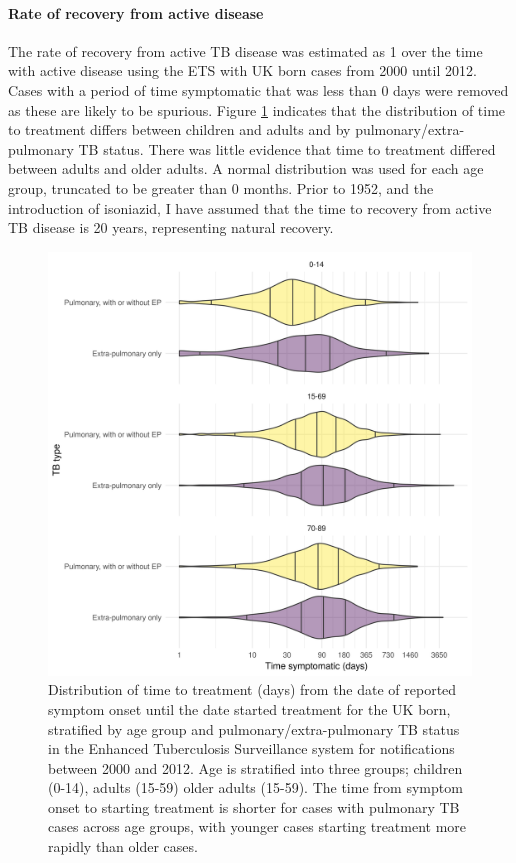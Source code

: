 \documentclass[11pt,twoside]{bristolthesis}
\begin{document}
  \hypertarget{rate-of-recovery-from-active-disease}{%
  \paragraph{Rate of recovery from active disease}\label{rate-of-recovery-from-active-disease}}
  
  The rate of recovery from active TB disease was estimated as 1 over the time with active disease using the ETS with UK born cases from 2000 until 2012. Cases with a period of time symptomatic that was less than 0 days were removed as these are likely to be spurious. Figure \ref{fig:tb-time-treat} indicates that the distribution of time to treatment differs between children and adults and by pulmonary/extra-pulmonary TB status. There was little evidence that time to treatment differed between adults and older adults. A normal distribution was used for each age group, truncated to be greater than 0 months. Prior to 1952, and the introduction of isoniazid, I have assumed that the time to recovery from active TB disease is 20 years, representing natural recovery.
  \begin{figure}
  
  {\centering \includegraphics[width=0.8\linewidth]{chapters/model-development/resources/figure/time_to_treatment} 
  
  }
  
  \caption{Distribution of time to treatment (days) from the date of reported symptom onset until the date started treatment for the UK born, stratified by age group and pulmonary/extra-pulmonary TB status in the Enhanced Tuberculosis Surveillance system for notifications between 2000 and 2012. Age is stratified into three groups; children (0-14), adults (15-59) older adults (15-59). The time from symptom onset to starting treatment is shorter for cases with pulmonary TB cases across age groups, with younger cases starting treatment more rapidly than older cases.}\label{fig:tb-time-treat}
  \end{figure}
\end{document}
